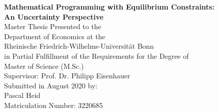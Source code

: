 \begin{titlepage}
	
\begin{center}
	
\vspace*{1.0cm}

{\LARGE
\bfseries Mathematical Programming with Equilibrium Constraints: \\
\vspace*{0.5cm}
An Uncertainty Perspective
}
\\


{\large
\vspace*{4.0cm}
Master Thesis Presented to the\\
\vspace*{0.25cm}
Department of Economics at the\\
\vspace*{0.25cm}
Rheinische Friedrich-Wilhelms-Universität Bonn\\

\vspace*{2.0cm}
in Partial Fulfillment of the Requirements for the Degree of\\
\vspace*{0.25cm}
Master of Science (M.Sc.)\\

\vspace*{4.0cm}
Supervisor: Prof. Dr. Philipp Eisenhauer\\

\vspace*{2.0cm}
Submitted in August 2020 by:\\
Pascal Heid\\
Matriculation Number: 3220685
}

\end{center}

\end{titlepage}
